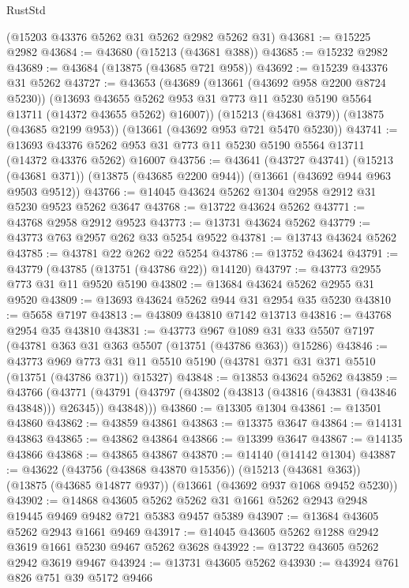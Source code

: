\begin{lexlean}{RustStd}
\begin{coremodule}
    (@15203 @43376 @5262 @31 @5262 @2982 @5262 @31)
@43681 := @15225 @2982
@43684 := @43680 (@15213 (@43681 @388))
@43685 := @15232 @2982
@43689 := @43684 (@13875 (@43685 @721 @958))
@43692 := @15239 @43376 @31 @5262
@43727 := @43653
    (@43689
      (@13661 (@43692 @958 @2200 @8724 @5230))
      (@13693 @43655 @5262 @953 @31 @773 @11 @5230 @5190 @5564 @13711 (@14372 @43655 @5262) @16007))
    (@15213 (@43681 @379))
    (@13875 (@43685 @2199 @953))
    (@13661 (@43692 @953 @721 @5470 @5230))
@43741 := @13693
    @43376
    @5262
    @953
    @31
    @773
    @11
    @5230
    @5190
    @5564
    @13711
    (@14372 @43376 @5262)
    @16007
@43756 := @43641
    (@43727 @43741)
    (@15213 (@43681 @371))
    (@13875 (@43685 @2200 @944))
    (@13661 (@43692 @944 @963 @9503 @9512))
@43766 := @14045 @43624 @5262 @1304 @2958 @2912 @31 @5230 @9523 @5262 @3647
@43768 := @13722 @43624 @5262
@43771 := @43768 @2958 @2912 @9523
@43773 := @13731 @43624 @5262
@43779 := @43773 @763 @2957 @262 @33 @5254 @9522
@43781 := @13743 @43624 @5262
@43785 := @43781 @22 @262 @22 @5254
@43786 := @13752 @43624
@43791 := @43779 (@43785 (@13751 (@43786 @22)) @14120)
@43797 := @43773 @2955 @773 @31 @11 @9520 @5190
@43802 := @13684 @43624 @5262 @2955 @31 @9520
@43809 := @13693 @43624 @5262 @944 @31 @2954 @35 @5230
@43810 := @5658 @7197
@43813 := @43809 @43810 @7142 @13713
@43816 := @43768 @2954 @35 @43810
@43831 := @43773
    @967
    @1089
    @31
    @33
    @5507
    @7197
    (@43781 @363 @31 @363 @5507 (@13751 (@43786 @363)) @15286)
@43846 := @43773
    @969
    @773
    @31
    @11
    @5510
    @5190
    (@43781 @371 @31 @371 @5510 (@13751 (@43786 @371)) @15327)
@43848 := @13853 @43624 @5262
@43859 := @43766
    (@43771 (@43791 (@43797 (@43802 (@43813 (@43816 (@43831 (@43846 @43848))) @26345)) @43848)))
@43860 := @13305 @1304
@43861 := @13501 @43860
@43862 := @43859 @43861
@43863 := @13375 @3647
@43864 := @14131 @43863
@43865 := @43862 @43864
@43866 := @13399 @3647
@43867 := @14135 @43866
@43868 := @43865 @43867
@43870 := @14140 (@14142 @1304)
@43887 := @43622
    (@43756 (@43868 @43870 @15356))
    (@15213 (@43681 @363))
    (@13875 (@43685 @14877 @937))
    (@13661 (@43692 @937 @1068 @9452 @5230))
@43902 := @14868
    @43605
    @5262
    @5262
    @31
    @1661
    @5262
    @2943
    @2948
    @19445
    @9469
    @9482
    @721
    @5383
    @9457
    @5389
@43907 := @13684 @43605 @5262 @2943 @1661 @9469
@43917 := @14045 @43605 @5262 @1288 @2942 @3619 @1661 @5230 @9467 @5262 @3628
@43922 := @13722 @43605 @5262 @2942 @3619 @9467
@43924 := @13731 @43605 @5262
@43930 := @43924 @761 @826 @751 @39 @5172 @9466

\end{coremodule}
\end{lexlean}
